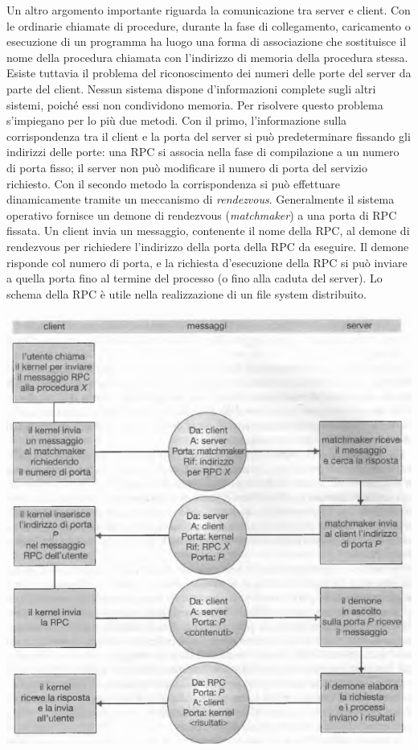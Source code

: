 \documentclass[11pt,a4paper]{article}
\begin{document}
Un altro argomento importante riguarda la comunicazione tra server e client. Con le
ordinarie chiamate di procedure, durante la fase di collegamento, caricamento o esecuzione
di un programma ha luogo una forma di associazione che sostituisce il nome
della procedura chiamata con l'indirizzo di memoria della procedura stessa.
Esiste
tuttavia il problema del riconoscimento dei numeri delle porte del server da parte del client.
Nessun sistema dispone d'informazioni complete sugli altri sistemi, poiché essi non condi­vidono memoria.
Per risolvere questo problema s'impiegano per lo più due metodi. Con il primo, l'in­formazione sulla corrispondenza tra il client e la porta del server si può predeterminare fis­sando gli indirizzi delle porte: una RPC si associa nella fase di compilazione a un numero di
porta fisso; il server non può modificare il numero di porta del servizio richiesto. Con il se­condo metodo la corrispondenza si può effettuare dinamicamente tramite un meccanismo
di \emph{rendezvous}. Generalmente il sistema operativo fornisce un demone di rendezvous (\emph{matchmaker}) a una porta di RPC fissata. Un client invia un messaggio, contenente il nome della
RPC, al demone di rendezvous per richiedere l'indirizzo della porta della RPC da eseguire. Il
demone risponde col numero di porta, e la richiesta d'esecuzione della RPC si può inviare a
quella porta fino al termine del processo (o fino alla caduta del server).
Lo schema della RPC è utile nella realizzazione di un file system distribuito.
\begin{center}
  \includegraphics[scale=0.6]{img/0008.png}
\end{center}
\end{document}
